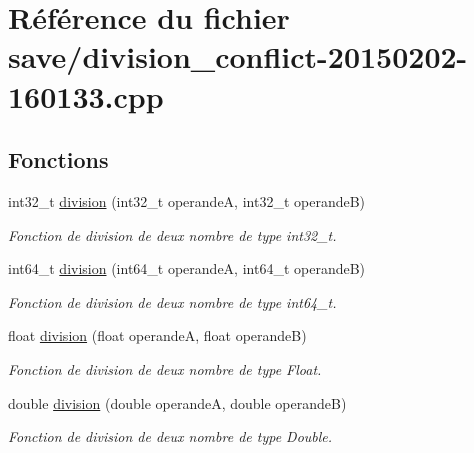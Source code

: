 \hypertarget{division__conflict-20150202-160133_8cpp}{\section{Référence du fichier save/division\-\_\-conflict-\/20150202-\/160133.cpp}
\label{division__conflict-20150202-160133_8cpp}
}
\subsection*{Fonctions}
\begin{DoxyCompactItemize}
\item 
int32\-\_\-t \hyperlink{division__conflict-20150202-160133_8cpp_ae00f81266e77e25c80acd87c92b2df73}{division} (int32\-\_\-t operande\-A, int32\-\_\-t operande\-B)
\begin{DoxyCompactList}\small\item\em Fonction de division de deux nombre de type int32\-\_\-t. \end{DoxyCompactList}\item 
int64\-\_\-t \hyperlink{division__conflict-20150202-160133_8cpp_afd3fd6a1f9f358543aaff269d93abb5b}{division} (int64\-\_\-t operande\-A, int64\-\_\-t operande\-B)
\begin{DoxyCompactList}\small\item\em Fonction de division de deux nombre de type int64\-\_\-t. \end{DoxyCompactList}\item 
float \hyperlink{division__conflict-20150202-160133_8cpp_af4c54d8902811c0d4964a29395bbb10e}{division} (float operande\-A, float operande\-B)
\begin{DoxyCompactList}\small\item\em Fonction de division de deux nombre de type Float. \end{DoxyCompactList}\item 
double \hyperlink{division__conflict-20150202-160133_8cpp_a8faf36a7828f61324d34749135d9aac8}{division} (double operande\-A, double operande\-B)
\begin{DoxyCompactList}\small\item\em Fonction de division de deux nombre de type Double. \end{DoxyCompactList}\end{DoxyCompactItemize}


